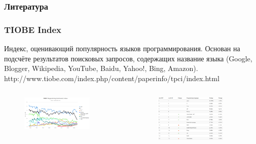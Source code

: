 \documentclass[default]{beamer}
\begin{document}
	\begin{frame}
		\frametitle{Литература}
		
		
		\nocite{*}
		
	\end{frame}
			
	\begin{frame}
		\frametitle{TIOBE Index}
		
		Индекс, оценивающий популярность языков программирования. Основан на подсчёте
		результатов поисковых запросов, содержащих название языка (Google, Blogger,
		Wikipedia, YouTube, Baidu, Yahoo!, Bing, Amazon).
		http://www.tiobe.com/index.php/content/paperinfo/tpci/index.html
		
		\begin{columns}
			\begin{column}{0.5\textwidth}
				\begin{figure}
					\includegraphics[width=0.8\textwidth]{tiobe_graph}
				\end{figure}
			\end{column}
			\begin{column}{0.5\textwidth}
				\begin{figure}
					\includegraphics[width=0.8\textwidth]{tiobe_table}
				\end{figure}
			\end{column}	
		\end{columns}
	\end{frame}
	
\end{document}
